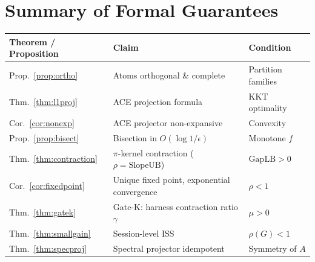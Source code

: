 \documentclass[11pt]{article}
\begin{document}
\section{Summary of Formal Guarantees}

\begin{center}
\begin{tabular}{lll}
\toprule
\textbf{Theorem / Proposition} & \textbf{Claim} & \textbf{Condition} \\
\midrule
Prop.~\ref{prop:ortho} & Atoms orthogonal \& complete & Partition families \\
Thm.~\ref{thm:l1proj} & ACE projection formula & KKT optimality \\
Cor.~\ref{cor:nonexp} & ACE projector non-expansive & Convexity \\
Prop.~\ref{prop:bisect} & Bisection in $O(\log 1/\epsilon)$ & Monotone $f$ \\
Thm.~\ref{thm:contraction} & $\pi$-kernel contraction ($\rho=\mathrm{SlopeUB}$) & $\mathrm{GapLB}>0$ \\
Cor.~\ref{cor:fixedpoint} & Unique fixed point, exponential convergence & $\rho<1$ \\
Thm.~\ref{thm:gatek} & Gate-K: harness contraction ratio $\gamma$ & $\mu>0$ \\
Thm.~\ref{thm:smallgain} & Session-level ISS & $\rho(G)<1$ \\
Thm.~\ref{thm:specproj} & Spectral projector idempotent & Symmetry of $A$ \\
\bottomrule
\end{tabular}
\end{center}

\nocite{*}
  
  
\end{document}

